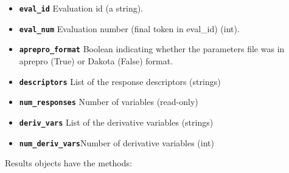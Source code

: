 \begin{itemize}

  \item{} \label{index:dakota.interfacing.Results.eval_id}\textbf{\texttt{eval\_id}} Evaluation id (a string).

  \item{} \label{index:dakota.interfacing.Results.eval_num}\textbf{\texttt{eval\_num}} Evaluation number (final token in eval\_id) (int).

  \item{} \label{index:dakota.interfacing.Results.aprepro_format}\textbf{\texttt{aprepro\_format}} Boolean indicating whether the parameters file was in
aprepro (True) or Dakota (False) format.

  \item{} \label{index:dakota.interfacing.Results.descriptors}\textbf{\texttt{descriptors}} List of the response descriptors (strings)

  \item{}  \label{index:dakota.interfacing.Results.num_responses}\textbf{\texttt{num\_responses}} Number of variables (read-only)

  \item{} \label{index:dakota.interfacing.Results.deriv_vars}\textbf{\texttt{deriv\_vars}} List of the derivative variables (strings)

  \item{}\label{index:dakota.interfacing.Results.num_deriv_vars}\textbf{\texttt{num\_deriv\_vars}}Number of derivative variables (int)

\end{itemize}

Results objects have the methods:

